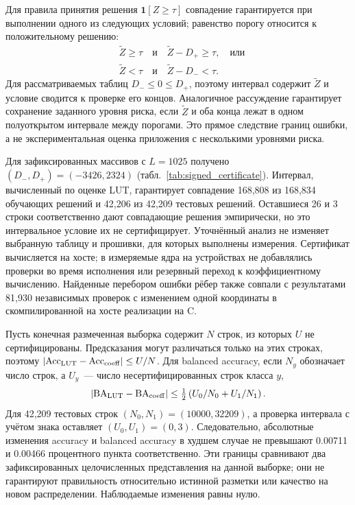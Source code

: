 Для правила принятия решения $\mathbf1[Z\geq\tau]$ совпадение гарантируется
при выполнении одного из следующих условий; равенство порогу относится
к положительному решению:
\begin{align}
 &\widetilde Z\geq\tau\quad\text{и}\quad\widetilde Z-D_+\geq\tau,
 \quad\text{или}\nonumber\\
 &\widetilde Z<\tau\quad\text{и}\quad\widetilde Z-D_-<\tau.
 \label{eq:signed_threshold_certificate}
\end{align}
Для рассматриваемых таблиц $D_-\leq0\leq D_+$, поэтому интервал содержит
$\widetilde Z$ и условие сводится к проверке его концов.
Аналогичное рассуждение гарантирует сохранение заданного уровня риска,
если $\widetilde Z$ и оба конца лежат в одном полуоткрытом интервале между
порогами. Это прямое следствие границ ошибки, а не экспериментальная
оценка приложения с несколькими уровнями риска.

Для зафиксированных массивов с $L=1025$ получено
$(D_-,D_+)=(-3426,2324)$ (табл.~\ref{tab:signed_certificate}).
Интервал, вычисленный по оценке LUT, гарантирует совпадение 168,808 из
168,834 обучающих решений и 42,206 из 42,209 тестовых решений.
Оставшиеся 26 и 3 строки соответственно дают совпадающие решения
эмпирически, но это интервальное условие их не сертифицирует.
Уточнённый анализ не изменяет выбранную таблицу и прошивки, для которых
выполнены измерения. Сертификат вычисляется на хосте; в измеряемые ядра
на устройствах не добавлялись проверки во время исполнения или резервный
переход к коэффициентному вычислению. Найденные перебором ошибки рёбер
также совпали с результатами 81,930 независимых проверок с изменением
одной координаты в скомпилированной на хосте реализации на C.

Пусть конечная размеченная выборка содержит $N$ строк, из которых $U$
не сертифицированы. Предсказания могут различаться только на этих строках,
поэтому
$|\mathrm{Acc}_{\rm LUT}-\mathrm{Acc}_{\rm coeff}|\leq U/N$.
Для balanced accuracy, если $N_y$ обозначает число строк, а $U_y$~---
число несертифицированных строк класса $y$,
\begin{equation}
 |\mathrm{BA}_{\rm LUT}-\mathrm{BA}_{\rm coeff}|
 \leq \tfrac12\left(U_0/N_0+U_1/N_1\right).
 \label{eq:certificate_metric_bound}
\end{equation}
Для 42,209 тестовых строк $(N_0,N_1)=(10000,32209)$, а проверка интервала
с учётом знака оставляет $(U_0,U_1)=(0,3)$. Следовательно, абсолютные
изменения accuracy и balanced accuracy в худшем случае не превышают
0.00711 и 0.00466 процентного пункта соответственно. Эти границы
сравнивают два зафиксированных целочисленных представления на данной
выборке; они не гарантируют правильность относительно истинной разметки
или качество на новом распределении. Наблюдаемые изменения равны нулю.

